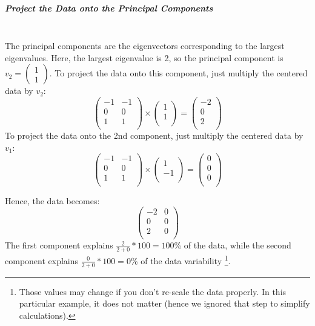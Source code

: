 \documentclass[]{article}
\begin{document}
	\subparagraph{Project the Data onto the Principal Components}
	\noindent\\
	The principal components are the eigenvectors corresponding to the largest eigenvalues.
	Here, the largest eigenvalue is 2, so the principal component is \( v_2 = \begin{pmatrix} 1 \\ 1 \end{pmatrix} \).
	To project the data onto this component, just multiply the centered data by \( v_2 \):
	$$
	\begin{pmatrix}
		-1 & -1 \\
		0 & 0 \\
		1 & 1 \\
	\end{pmatrix}
	\times
	\begin{pmatrix}
		1 \\
		1 \\
	\end{pmatrix}
	=
	\begin{pmatrix}
		-2 \\
		0 \\
		2 \\
	\end{pmatrix}
	$$
	To project the data onto the 2nd component, just multiply the centered data by \( v_1 \):
	$$
	\begin{pmatrix}
		-1 & -1 \\
		0 & 0 \\
		1 & 1 \\
	\end{pmatrix}
	\times
	\begin{pmatrix}
		1 \\
		-1 \\
	\end{pmatrix}
	=
	\begin{pmatrix}
		0 \\
		0 \\
		0 \\
	\end{pmatrix}
	$$
	
	Hence, the data becomes:
	$$
	\begin{pmatrix}
		-2 & 0 \\
		0 & 0 \\
		2 & 0 \\
	\end{pmatrix}
	$$
	The first component explains $\frac{2}{2+0}*100 = 100$\% of the data, while the second component explains $\frac{0}{2+0}*100 = 0$\% of the data variability
	\footnote{
		Those values may change if you don't re-scale the data properly.
		In this particular example, it does not matter (hence we ignored that step to simplify calculations).
	}.
	
\end{document}

